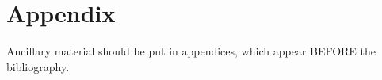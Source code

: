 \documentclass[11pt]{ucscthesis}
\begin{document}
\appendix
\chapter{Appendix}

Ancillary material should be put in appendices, which appear BEFORE the
bibliography.



\def\baselinestretch{1.0}\large\normalsize



\end{document}
